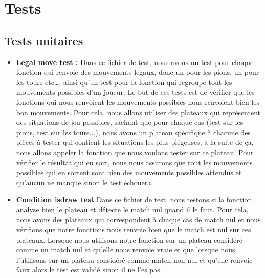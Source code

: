 \huge\documentclass{article}
\begin{document}
\medskip

\newpage
\section{Tests}
\subsection{Tests unitaires}

\begin{itemize}
    \item \textbf{Legal move test :} \newline
    Dans ce fichier de test, nous avons un test pour chaque fonction qui renvoie des mouvements légaux, donc un pour les pions, un pour les tours etc\dots , ainsi qu'un test pour la fonction qui regroupe tout les mouvements possibles d'un joueur.\newline
    Le but de ces tests est de vérifier que les fonctions qui nous renvoient les mouvements possibles nous renvoient bien les bon mouvements.\newline
    Pour cela, nous allons utiliser des plateaux qui représentent des situations de jeu possibles, sachant que pour chaque cas (test sur les pions, test sur les tours...), nous avons un plateau spécifique à chacune des pièces à tester qui contient les situations les plus piégeuses, à la suite de ça, nous allons appeler la fonction que nous voulons tester sur ce plateau.\newline
    Pour vérifier le résultat qui en sort, nous nous assurons que tout les mouvements possibles qui en sortent sont bien des mouvements possibles attendus et qu'aucun ne manque sinon le test échouera.\newline
    
    \item \textbf{Condition isdraw test}\newline
    Dans ce fichier de test, nous testons si la fonction analyse bien le plateau et détecte le match nul quand il le faut.\newline
    Pour cela, nous avons des plateaux qui correspondent à chaque cas de match nul et nous vérifions que notre fonctions nous renvoie bien que le match est nul sur ces plateaux.\newline
    Lorsque nous utilisons notre fonction sur un plateau considéré comme un match nul et qu'elle nous renvoie vraie et que lorsque nous l'utilisons sur un plateau considéré comme match non nul et qu'elle renvoie faux alors le test est validé sinon il ne l'es pas.\newline
    

\end{itemize}
\end{document}

